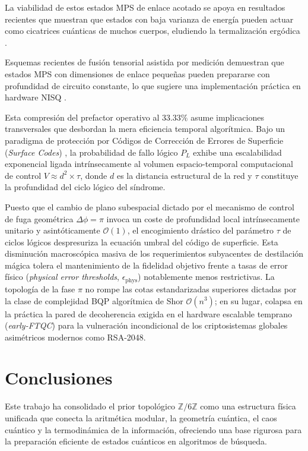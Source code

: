 \documentclass[12pt,a4paper]{article}
\theoremstyle{plain}
\theoremstyle{definition}
\theoremstyle{remark}
\begin{document}
La viabilidad de estos estados MPS de enlace acotado se apoya en resultados recientes que muestran que estados con baja varianza de energía pueden actuar como cicatrices cuánticas de muchos cuerpos, eludiendo la termalización ergódica \cite{Rai2024}.

Esquemas recientes de fusión tensorial asistida por medición demuestran que estados MPS con dimensiones de enlace pequeñas pueden prepararse con profundidad de circuito constante, lo que sugiere una implementación práctica en hardware NISQ \cite{Stephen2025}.

Esta compresión del prefactor operativo al $33.33\%$ asume implicaciones transversales que desbordan la mera eficiencia temporal algorítmica. Bajo un paradigma de protección por Códigos de Corrección de Errores de Superficie (\textit{Surface Codes}) \cite{Fowler2012}, la probabilidad de fallo lógico $P_L$ exhibe una escalabilidad exponencial ligada intrínsecamente al volumen espacio-temporal computacional de control $V \approx d^2 \times \tau$, donde $d$ es la distancia estructural de la red y $\tau$ constituye la profundidad del ciclo lógico del síndrome.

Puesto que el cambio de plano subespacial dictado por el mecanismo de control de fuga geométrica $\Delta\phi = \pi$ invoca un coste de profundidad local intrínsecamente unitario y asintóticamente $\mathcal{O}(1)$, el encogimiento drástico del parámetro $\tau$ de ciclos lógicos despresuriza la ecuación umbral del código de superficie. Esta disminución macroscópica masiva de los requerimientos subyacentes de destilación mágica tolera el mantenimiento de la fidelidad objetivo frente a tasas de error físico (\textit{physical error thresholds}, $\epsilon_{\text{phys}}$) notablemente menos restrictivas. La topología de la fase $\pi$ no rompe las cotas estandarizadas superiores dictadas por la clase de complejidad BQP algorítmica de Shor $\mathcal{O}(n^3)$; en su lugar, colapsa en la práctica la pared de decoherencia exigida en el hardware escalable temprano (\textit{early-FTQC}) para la vulneración incondicional de los criptosistemas globales asimétricos modernos como RSA-2048.

\section{Conclusiones}
\label{sec:conclusiones}

Este trabajo ha consolidado el prior topológico $\mathbb{Z}/6\mathbb{Z}$ como una estructura física unificada que conecta la aritmética modular, la geometría cuántica, el caos cuántico y la termodinámica de la información, ofreciendo una base rigurosa para la preparación eficiente de estados cuánticos en algoritmos de búsqueda.
\end{document}
